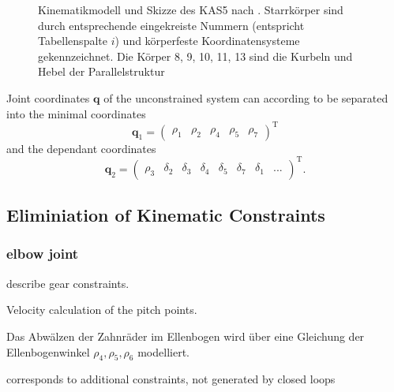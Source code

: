 \documentclass[letterpaper, 10 pt, conference]{ieeeconf}  %
\begin{document}
\begin{figure}[htb]
    \tiny
    \begin{minipage}[t]{7.5cm}
        \vspace{0.2cm} %
        
    \end{minipage}

    \caption[Kinematikmodell und Skizze des KAS5]{Kinematikmodell und Skizze des KAS5 nach \cite{KhalilKle1986}. Starrkörper sind durch entsprechende eingekreiste Nummern (entspricht Tabellenspalte \glqq{}$i$\grqq{}) und körperfeste Koordinatensysteme gekennzeichnet. Die Körper 8, 9, 10, 11, 13 sind die Kurbeln und Hebel der Parallelstruktur}
    \label{fig:KAS5_kinematik}
\end{figure}

Joint coordinates $\bm{q}$ of the unconstrained system can according to \cite{NakamuraGho1989} be separated into the  minimal coordinates
%
\begin{equation}
\bm{q}_1=\begin{pmatrix}\rho_1 & \rho_2 & \rho_4 & \rho_5 &\rho_7 \end{pmatrix}^\mathrm{T}
\end{equation}
%
and the dependant coordinates
%
\begin{equation}
\bm{q}_2=\begin{pmatrix}\rho_3 & \delta_2 & \delta_3 & \delta_4 & \delta_5 & \delta_7 & \delta_1 & ... \end{pmatrix}^\mathrm{T}.
\end{equation}

\subsection{Eliminiation of Kinematic Constraints}


\subsubsection{elbow joint}

describe gear constraints.

Velocity calculation of the pitch points.

Das Abwälzen der Zahnräder im Ellenbogen wird über eine Gleichung der Ellenbogenwinkel $\rho_4,\rho_5,\rho_6$ modelliert.

corresponds to additional constraints, not generated by closed loops
\end{document}
